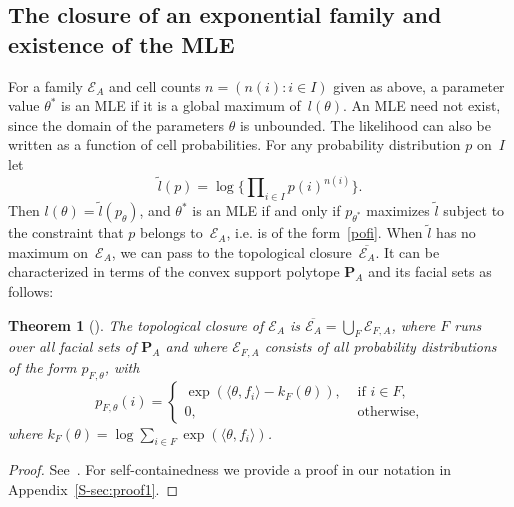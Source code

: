 \documentclass[aos,noinfoline]{imsart}
\def\R{{\mathbf R}}
\newcommand{\Ecal}{\mathcal{E}}
\newcommand{\Pbf}{\mathbf{P}}
\newtheorem{theorem}{Theorem}[section]
\theoremstyle{remark}
\theoremstyle{definition}
\begin{document}
\subsection{The closure of an exponential family and existence of the MLE}

For a family $\Ecal_{A}$ and cell counts $n=(n(i): i\in I)$ given as above, a parameter value $\theta^{*}$ is an MLE if it is a global maximum of~$l(\theta)$.
%
An MLE need not exist, since the domain of the parameters $\theta$ is unbounded.  The likelihood can also be written as a function of cell probabilities.  For any probability
distribution $p$ on~$I$ let
\begin{equation*}
  \tilde l(p) = \log\{\prod\nolimits_{i\in I}p(i)^{n(i)}\}.
\end{equation*}
Then $l(\theta) = \tilde l(p_{\theta})$, and $\theta^{*}$ is an MLE if and only if $p_{\theta^{*}}$ maximizes $\tilde l$
subject to the constraint that $p$ belongs to~$\Ecal_{A}$, i.e. is of the form~\eqref{pofi}.
When $\tilde l$ has no maximum on~$\Ecal_{A}$, we can pass to the topological closure~$\overline{\Ecal_{A}}$.
It can be characterized in terms of the convex support polytope $\Pbf_{A}$ and its facial sets
as follows:
\begin{theorem}[\citet{Barndorff:exponential_families}]
  \label{thm:closure-of-expfam}
   The topological closure of $\Ecal_{A}$ is $\overline{\Ecal_{A}} = \bigcup_{F}\Ecal_{F,A}$,
   where $F$ runs over all facial sets of %
   $\Pbf_{A}$ and where $\Ecal_{F,A}$ consists of all probability distributions of the form
  $p_{F,\theta}$, with
  \begin{equation}
    \label{eq:p-f-theta}
    p_{F,\theta}(i) =
    \begin{cases}
      \exp(\langle \theta, f_i\rangle  - k_{F}(\theta)), & \text{ if }i\in F, \\
      0, & \text{ otherwise},
    \end{cases}
  \end{equation}
  where $k_{F}(\theta) = \log \sum_{i\in F}\exp(\langle \theta, f_i\rangle)$.
\end{theorem}
\begin{proof}
  See~\cite{Barndorff:exponential_families}.
  For self-containedness we provide a proof in our notation in Appendix~\ref{S-sec:proof1}.
\end{proof}
\end{document}

